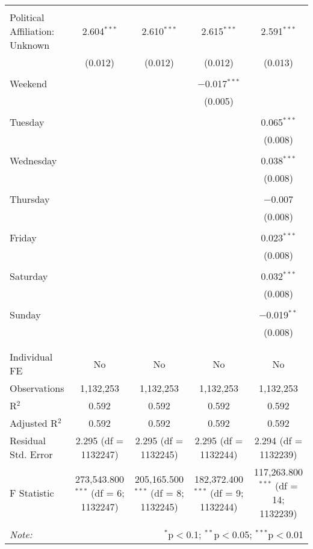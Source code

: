 \documentclass[
]{article}
\begin{document}
\begin{table}[!htbp]
{\begin{tabular}{@{\extracolsep{5pt}}lcccc}
  & & & & \\ 
 Political Affiliation: Unknown & 2.604$^{***}$ & 2.610$^{***}$ & 2.615$^{***}$ & 2.591$^{***}$ \\ 
  & (0.012) & (0.012) & (0.012) & (0.013) \\ 
  & & & & \\ 
 Weekend &  &  & $-$0.017$^{***}$ &  \\ 
  &  &  & (0.005) &  \\ 
  & & & & \\ 
 Tuesday &  &  &  & 0.065$^{***}$ \\ 
  &  &  &  & (0.008) \\ 
  & & & & \\ 
 Wednesday &  &  &  & 0.038$^{***}$ \\ 
  &  &  &  & (0.008) \\ 
  & & & & \\ 
 Thursday &  &  &  & $-$0.007 \\ 
  &  &  &  & (0.008) \\ 
  & & & & \\ 
 Friday &  &  &  & 0.023$^{***}$ \\ 
  &  &  &  & (0.008) \\ 
  & & & & \\ 
 Saturday &  &  &  & 0.032$^{***}$ \\ 
  &  &  &  & (0.008) \\ 
  & & & & \\ 
 Sunday &  &  &  & $-$0.019$^{**}$ \\ 
  &  &  &  & (0.008) \\ 
  & & & & \\ 
\hline \\[-1.8ex] 
Individual FE & No & No & No & No \\ 
Observations & 1,132,253 & 1,132,253 & 1,132,253 & 1,132,253 \\ 
R$^{2}$ & 0.592 & 0.592 & 0.592 & 0.592 \\ 
Adjusted R$^{2}$ & 0.592 & 0.592 & 0.592 & 0.592 \\ 
Residual Std. Error & 2.295 (df = 1132247) & 2.295 (df = 1132245) & 2.295 (df = 1132244) & 2.294 (df = 1132239) \\ 
F Statistic & 273,543.800$^{***}$ (df = 6; 1132247) & 205,165.500$^{***}$ (df = 8; 1132245) & 182,372.400$^{***}$ (df = 9; 1132244) & 117,263.800$^{***}$ (df = 14; 1132239) \\ 
\hline 
\hline \\[-1.8ex] 
\textit{Note:}  & \multicolumn{4}{r}{$^{*}$p$<$0.1; $^{**}$p$<$0.05; $^{***}$p$<$0.01} \\ 
\end{tabular}
} 
\end{table} 
\newpage
\end{document}
